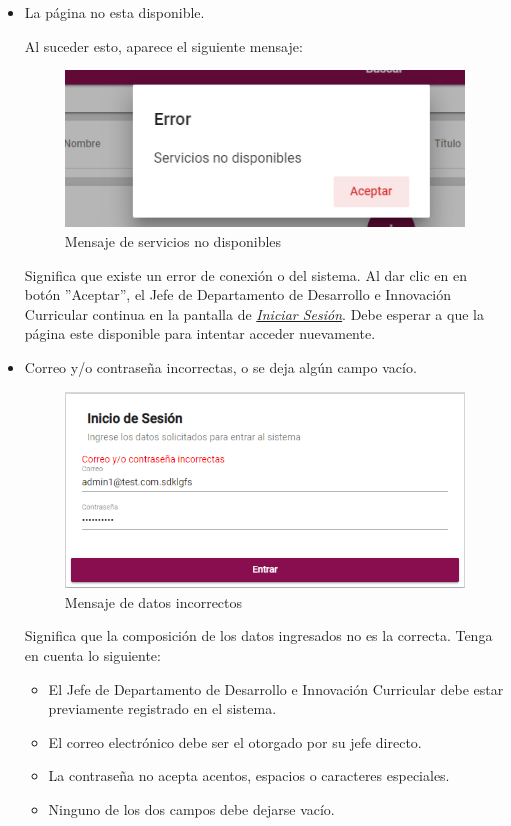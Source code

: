             \begin{itemize}
                \item La página no esta disponible.

                    Al suceder esto, aparece el siguiente mensaje:
                    \begin{figure}[H]
                        \centering
                        \hypertarget{MSG25}{\includegraphics[width=0.4\linewidth]{images/SP5/MSGSN}}
                        \caption{Mensaje de servicios no disponibles}
                    \end{figure}

                    Significa que existe un error de conexión o del sistema. Al dar clic en en botón ''Aceptar'', el Jefe de Departamento de Desarrollo e Innovación Curricular continua en la pantalla de \hyperlink{iniciarL}{\textit{Iniciar Sesión}}. Debe esperar a que la página este disponible para intentar acceder nuevamente.

                \item Correo y/o contraseña incorrectas, o se deja algún campo vacío.
                    \begin{figure}[H]
                        \centering
                        \hypertarget{MSG0}{\includegraphics[width=0.4\linewidth]{images/SP5/LoginIncorrecto}}
                        \caption{Mensaje de datos incorrectos}
                    \end{figure}

                Significa que la composición de los datos ingresados no es la correcta. Tenga en cuenta lo siguiente:

                            \begin{itemize}
                                \item El Jefe de Departamento de Desarrollo e Innovación Curricular debe estar previamente registrado en el sistema.
                                \item El correo electrónico debe ser el otorgado por su jefe directo.
                                \item La contraseña no acepta acentos, espacios o caracteres especiales.
                                \item Ninguno de los dos campos debe dejarse vacío.
                            \end{itemize}

            \end{itemize}
